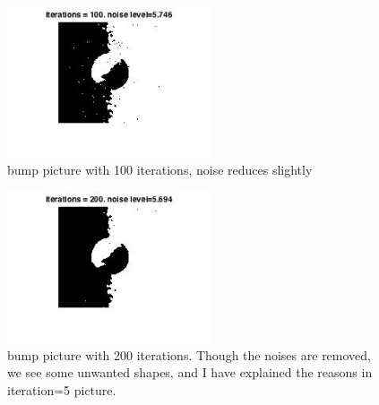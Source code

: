 \documentclass[twoside]{article}
\theoremstyle{definition}
\theoremstyle{definition}
\theoremstyle{remark}
\begin{document}
\begin{figure}[H]
\centering
\includegraphics[width=60mm]{100_bump.jpg}
\caption{bump picture with 100 iterations, noise reduces slightly}
\end{figure}

\begin{figure}[H]
\centering
\includegraphics[width=60mm]{200_bump.jpg}
\caption{bump picture with 200 iterations. Though the noises are removed, we see some unwanted shapes, and I have explained the reasons in iteration=5 picture. }
\end{figure}
\end{document}
